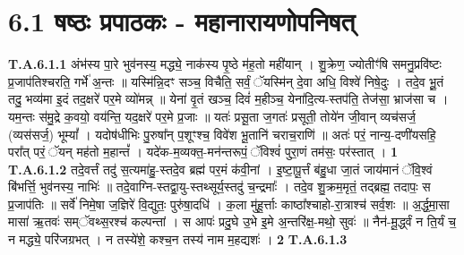 \documentclass[17pt]{extarticle}
\begin{document}
\section*{ 6.1     षष्ठः प्रपाठकः - महानारायणोपनिषत् }
                                \textbf{ T.A.6.1.1} \newline
                  अंभ॑स्य पा॒रे भुव॑नस्य॒ मद्ध्ये॒ नाक॑स्य पृ॒ष्ठे म॑ह॒तो मही॑यान् ।  शु॒क्रेण॒ ज्योतीꣳ॑षि समनु॒प्रवि॑ष्टः प्र॒जाप॑तिश्चरति॒ गर्भे॑ अ॒न्तः ॥  यस्मि॑न्नि॒दꣳ सञ्च॒ विचैति॒ सर्वं॒ ॅयस्मि॑न् दे॒वा अधि॒ विश्वे॑ निषे॒दुः ।  तदे॒व भू॒॒तं तदु॒ भव्य॑मा इ॒दं तद॒क्षरे॑ पर॒मे व्यो॑मन्न् ॥ येना॑ वृ॒तं खञ्च॒ दिवं॑ म॒हीञ्च॒ येना॑दि॒त्य-स्तप॑ति॒ तेज॑सा॒ भ्राज॑सा च ।  यम॒न्तः स॑मु॒द्रे क॒वयो॒ वय॑न्ति॒ यद॒क्षरे॑ पर॒मे प्र॒जाः ॥ यतः॑ प्रसू॒ता ज॒गतः॑ प्रसूती॒ तोये॑न जी॒वान् व्यच॑सर्ज॒ (व्यस॑सर्ज॒) भूम्यां᳚ ।  यदोष॑धीभिः पु॒रुषा᳚न् प॒शूꣳश्च॒ विवे॑श भू॒तानि॑ चराच॒राणि॑ ॥ अतः॑ परं॒ नान्य॒-दणी॑यसहि॒ परा᳚त् परं॒ ॅयन् मह॑तो म॒हान्तं᳚ ।  यदे॑क-म॒व्यक्त॒-मन॑न्तरूपं॒ ॅविश्वं॑ पुरा॒णं तम॑सः॒ पर॑स्तात् । \textbf{ 1} \newline
                  \newline
                                                                  \textbf{ T.A.6.1.2} \newline
                  तदे॒वर्त्तं तदु॑ स॒त्यमा॑हु॒-स्तदे॒व ब्रह्म॑ पर॒मं क॑वी॒नां ।  इ॒ष्टा॒पू॒र्त्तं ब॑हु॒धा जा॒तं जाय॑मानं ॅवि॒श्वं बि॑भर्त्ति॒ भुव॑नस्य॒ नाभिः॑ ॥ तदे॒वाग्नि-स्तद्वा॒यु-स्तथ्सूर्य॒स्तदु॑ च॒न्द्रमाः᳚ ।  तदे॒व शु॒क्रम॒मृतं॒ तद्ब्रह्म॒ तदापः॒ स प्र॒जाप॑तिः ॥ सर्वे॑ निमे॒षा ज॒ज्ञिरे॑ वि॒द्युतः॒ पुरु॑षा॒दधि॑ ।  क॒ला मु॑हू॒र्त्ताः काष्ठा᳚श्चाहो-रा॒त्राश्च॑ सर्व॒शः ॥ अ॒र्द्ध॒मा॒सा मासा॑ ऋ॒तवः॑ सम्ॅवथ्स॒रश्च॑ कल्पन्तां । स आपः॑ प्रदु॒घे उ॒भे इ॒मे अ॒न्तरि॑क्ष॒-मथो॒ सुवः॑ ॥ नैन॑-मू॒र्द्ध्वं न ति॒र्यं च॒ न मद्ध्ये॒ परि॑जग्रभत् । न तस्ये॑शे॒ कश्च॒न तस्य॑ नाम म॒हद्यशः॑ । \textbf{ 2} \newline
                  \newline
                                                                  \textbf{ T.A.6.1.3} \newline
\end{document}
